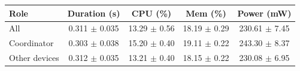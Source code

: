 \begin{tabular}{lcccc}
\hline
\textbf{Role} & \textbf{Duration (s)} & \textbf{CPU (\%)} & \textbf{Mem (\%)} & \textbf{Power (mW)} \\
\hline
All & 0.311 $\pm$ 0.035 & 13.29 $\pm$ 0.56 & 18.19 $\pm$ 0.29 & 230.61 $\pm$ 7.45 \\
Coordinator & 0.303 $\pm$ 0.038 & 15.20 $\pm$ 0.40 & 19.11 $\pm$ 0.22 & 243.30 $\pm$ 8.37 \\
Other devices & 0.312 $\pm$ 0.035 & 13.21 $\pm$ 0.40 & 18.15 $\pm$ 0.22 & 230.08 $\pm$ 6.95 \\
\hline
\end{tabular}
